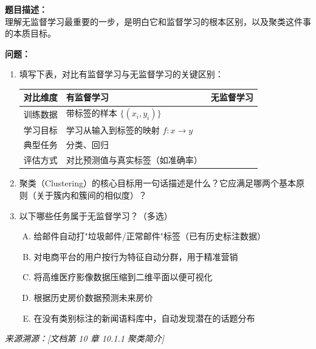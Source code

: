 \documentclass[a4paper,11pt]{ctexart}
\begin{document}
\begin{problembox}
    \textbf{题目描述：}\\
    理解无监督学习最重要的一步，是明白它和监督学习的根本区别，以及聚类这件事的本质目标。

    \vspace{0.3cm}
    \textbf{问题：}
    \begin{enumerate}[(1)]
        \item 填写下表，对比有监督学习与无监督学习的关键区别：

        \begin{center}
        \begin{tabular}{p{3.5cm} p{4.5cm} p{4.5cm}}
            \toprule
            对比维度 & 有监督学习 & 无监督学习 \\
            \midrule
            训练数据 & 带标签的样本 $\{(x_i, y_i)\}$ & \underline{\hspace{3.5cm}} \\[1.2em]
            学习目标 & 学习从输入到标签的映射 $f: x \to y$ & \underline{\hspace{3.5cm}} \\[1.2em]
            典型任务 & 分类、回归 & \underline{\hspace{3.5cm}} \\[1.2em]
            评估方式 & 对比预测值与真实标签（如准确率） & \underline{\hspace{3.5cm}} \\
            \bottomrule
        \end{tabular}
        \end{center}

        \item 聚类（Clustering）的核心目标用一句话描述是什么？它应满足哪两个基本原则（关于簇内和簇间的相似度）？

        \item 以下哪些任务属于无监督学习？（多选）
        \begin{enumerate}[A.]
            \item 给邮件自动打"垃圾邮件/正常邮件"标签（已有历史标注数据）
            \item 对电商平台的用户按行为特征自动分群，用于精准营销
            \item 将高维医疗影像数据压缩到二维平面以便可视化
            \item 根据历史房价数据预测未来房价
            \item 在没有类别标注的新闻语料库中，自动发现潜在的话题分布
        \end{enumerate}
    \end{enumerate}

    \vspace{0.2cm}
    {\color{gray}\small\textit{来源溯源：[文档第 10 章 10.1.1 聚类简介]}}
\end{problembox}
\end{document}
